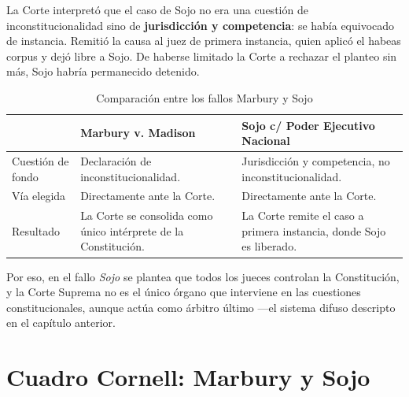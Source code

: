 \documentclass[12pt,oneside]{book}
\begin{document}
La Corte interpretó que el caso de Sojo no era una cuestión de inconstitucionalidad sino de \textbf{jurisdicción y competencia}: se había equivocado de instancia. Remitió la causa al juez de primera instancia, quien aplicó el habeas corpus y dejó libre a Sojo. De haberse limitado la Corte a rechazar el planteo sin más, Sojo habría permanecido detenido.

\begin{table}[H]
\centering
\small
\caption{Comparación entre los fallos Marbury y Sojo}
\begin{tabularx}{\textwidth}{Q{0.20\textwidth}YY}
\toprule
& \textbf{Marbury v. Madison} & \textbf{Sojo c/ Poder Ejecutivo Nacional} \\
\midrule
Cuestión de fondo & Declaración de inconstitucionalidad. & Jurisdicción y competencia, no inconstitucionalidad. \\
Vía elegida & Directamente ante la Corte. & Directamente ante la Corte. \\
Resultado & La Corte se consolida como único intérprete de la Constitución. & La Corte remite el caso a primera instancia, donde Sojo es liberado. \\
\bottomrule
\end{tabularx}
\end{table}

Por eso, en el fallo \emph{Sojo} se plantea que todos los jueces controlan la Constitución, y la Corte Suprema no es el único órgano que interviene en las cuestiones constitucionales, aunque actúa como árbitro último ---el sistema difuso descripto en el capítulo anterior.

\section{Cuadro Cornell: Marbury y Sojo}
\end{document}

